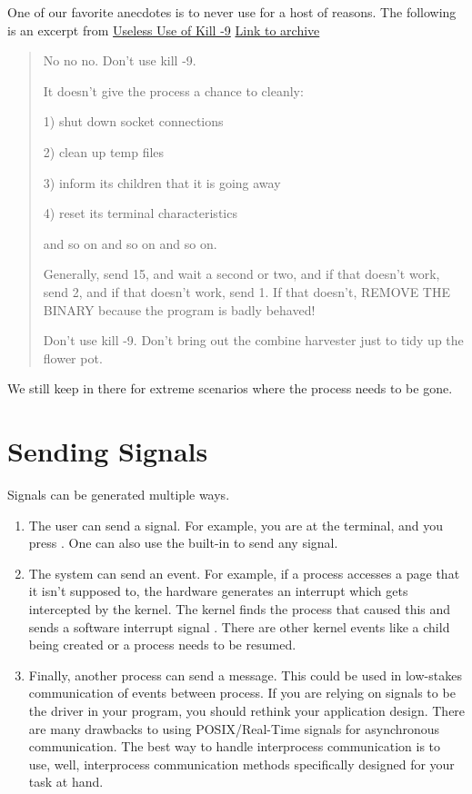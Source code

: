 One of our favorite anecdotes is to never use  for a host of reasons.
The following is an excerpt from \underline{Useless Use of Kill -9} \href{http://porkmail.org/era/unix/award.html}{Link to archive}

\begin{quote}
No no no.  Don't use kill -9.

It doesn't give the process a chance to cleanly:

1) shut down socket connections

2) clean up temp files

3) inform its children that it is going away

4) reset its terminal characteristics

and so on and so on and so on.

Generally, send 15, and wait a second or two, and if that doesn't
work, send 2, and if that doesn't work, send 1.  If that doesn't,
REMOVE THE BINARY because the program is badly behaved!

Don't use kill -9.  Don't bring out the combine harvester just to tidy
up the flower pot.
\end{quote}

We still keep  in there for extreme scenarios where the process needs to be gone.

\section{Sending Signals}

Signals can be generated multiple ways.
\begin{enumerate}
\item The user can send a signal.
  For example, you are at the terminal, and you press .
  One can also use the built-in  to send any signal.
\item The system can send an event.
For example, if a process accesses a page that it isn't supposed to, the hardware generates an interrupt which gets intercepted by the kernel.
The kernel finds the process that caused this and sends a \gls{software interrupt} signal .
There are other kernel events like a child being created or a process needs to be resumed.

\item Finally, another process can send a message.
  This could be used in low-stakes communication of events between process.
  If you are relying on signals to be the driver in your program, you should rethink your application design.
  There are many drawbacks to using POSIX/Real-Time signals for asynchronous communication.
  The best way to handle interprocess communication is to use, well, interprocess communication methods specifically designed for your task at hand.
\end{enumerate}

